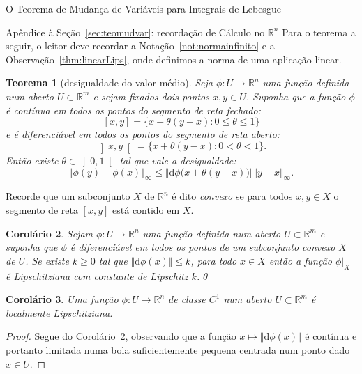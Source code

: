 \documentclass[oneside,final,11pt]{amsbook}
\newcommand{\R}{\mathds R}
\newcommand{\dd}{\mathrm d}
\theoremstyle{remark}\newtheorem{exercise}{Exercício}[chapter]
\theoremstyle{remark}\newtheorem{*exercise}[exercise]{\hbox to 0pt{\hskip 0pt minus 1fil*}Exercício}
\theoremstyle{definition}\newtheorem{exdefin}{Definição}[chapter]
\theoremstyle{plain}\newtheorem{teo}{Teorema}[section]
\theoremstyle{plain}\newtheorem{lem}[teo]{Lema}
\theoremstyle{plain}\newtheorem{prop}[teo]{Proposição}
\theoremstyle{plain}\newtheorem{cor}[teo]{Corolário}
\theoremstyle{definition}\newtheorem{defin}[teo]{Definição}
\theoremstyle{remark}\newtheorem{rem}[teo]{Observação}
\theoremstyle{definition}\newtheorem{notation}[teo]{Notação}
\theoremstyle{definition}\newtheorem{convention}[teo]{Convenção}
\theoremstyle{definition}\newtheorem{example}[teo]{Exemplo}
\numberwithin{section}{chapter}
\numberwithin{equation}{section}
\begin{document}
\begin{chapter}{O Teorema de Mudança de Variáveis para Integrais de Lebesgue}
\begin{section}[recordação de Cálculo no $\R^n$]{Apêndice à Seção~\ref{sec:teomudvar}: recordação de Cálculo no ${\R^n}$}
Para o teorema a seguir,
o leitor deve recordar a Notação~\ref{not:normainfinito} e a Observação~\ref{thm:linearLips}, onde definimos a norma de uma
aplicação linear.
\begin{teo}[desigualdade do valor médio]
Seja $\phi:U\to\R^n$ uma função definida num aberto $U\subset\R^m$ e sejam fixados dois pontos $x,y\in U$. Suponha
que a função $\phi$ é contínua em todos os pontos do {\em segmento de reta fechado}:\index[simbolos]{$[x,y]$}
\[[x,y]=\big\{x+\theta(y-x):0\le\theta\le1\big\}\]
e é diferenciável em todos os pontos do {\em segmento de reta aberto}:\index[simbolos]{$\left]x,y\right[$}
\[\left]x,y\right[=\big\{x+\theta(y-x):0<\theta<1\big\}.\]
Então existe $\theta\in\left]0,1\right[$ tal que vale a desigualdade:
\[\Vert\phi(y)-\phi(x)\Vert_\infty\le\big\Vert\dd\phi\big(x+\theta(y-x)\big)\big\Vert\Vert y-x\Vert_\infty.\]
\end{teo}

Recorde que um subconjunto $X$ de $\R^n$ é dito {\em convexo\/}
se para todos $x,y\in X$ o segmento de reta $[x,y]$ está contido em $X$.
\begin{cor}\label{thm:cordesigmedLips}
Sejam $\phi:U\to\R^n$ uma função definida num aberto $U\subset\R^m$ e suponha que $\phi$ é diferenciável em todos
os pontos de um subconjunto convexo $X$ de $U$. Se existe $k\ge0$ tal que $\Vert\dd\phi(x)\Vert\le k$, para todo $x\in X$
então a função $\phi\vert_X$ é Lipschitziana com constante de Lipschitz $k$.\qed
\end{cor}

\begin{cor}\label{thm:C1locLips}
Uma função $\phi:U\to\R^n$ de classe $C^1$ num aberto $U\subset\R^m$ é localmente Lipschitziana.
\end{cor}
\begin{proof}
Segue do Corolário~\ref{thm:cordesigmedLips}, observando que a função $x\mapsto\Vert\dd\phi(x)\Vert$ é contínua e portanto
limitada numa bola suficientemente pequena centrada num ponto dado $x\in U$.
\end{proof}


\end{section}
\end{chapter}
\end{document}
